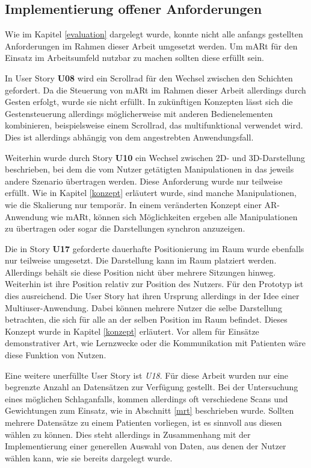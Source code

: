 \subsection{Implementierung offener  Anforderungen}

Wie im Kapitel \ref{evaluation} dargelegt wurde, konnte nicht alle anfangs gestellten Anforderungen im Rahmen dieser Arbeit umgesetzt werden. Um mARt für den Einsatz im Arbeitsumfeld nutzbar zu machen sollten diese erfüllt sein.

In User Story \textbf{U08} wird ein Scrollrad für den Wechsel zwischen den Schichten gefordert. Da die Steuerung von mARt im Rahmen dieser Arbeit allerdings durch Gesten erfolgt, wurde sie nicht erfüllt. In zukünftigen Konzepten lässt sich die Gestensteuerung allerdings möglicherweise mit anderen Bedienelementen kombinieren, beispielsweise einem Scrollrad, das multifunktional verwendet wird. Dies ist allerdings abhängig von dem angestrebten Anwendungsfall.

Weiterhin wurde durch Story \textbf{U10} ein Wechsel zwischen 2D- und 3D-Darstellung beschrieben, bei dem die vom Nutzer getätigten Manipulationen in das jeweils andere Szenario übertragen werden. Diese Anforderung wurde nur teilweise erfüllt. Wie in Kapitel \ref{konzept} erläutert wurde, sind manche Manipulationen, wie die Skalierung nur temporär. In einem veränderten Konzept einer AR-Anwendung wie mARt, können sich Möglichkeiten ergeben alle Manipulationen zu übertragen oder sogar die Darstellungen synchron anzuzeigen.

Die in Story \textbf{U17} geforderte dauerhafte Positionierung im Raum wurde ebenfalls nur teilweise umgesetzt. Die Darstellung kann im Raum platziert werden. Allerdings behält sie diese Position nicht über mehrere Sitzungen hinweg. 
Weiterhin ist ihre Position relativ zur Position des Nutzers. Für den Prototyp ist dies ausreichend. Die User Story hat ihren Ursprung allerdings in der Idee einer Multiuser-Anwendung. Dabei können mehrere Nutzer die selbe Darstellung betrachten, die sich für alle an der selben Position im Raum befindet. Dieses Konzept wurde in Kapitel \ref{konzept} erläutert. Vor allem für Einsätze demonstrativer Art, wie Lernzwecke oder die Kommunikation mit Patienten wäre diese Funktion von Nutzen.

Eine weitere unerfüllte User Story ist \textit{U18}. Für diese Arbeit wurden nur eine begrenzte Anzahl an Datensätzen zur Verfügung gestellt. Bei der Untersuchung eines möglichen Schlaganfalls, kommen allerdings oft verschiedene Scans und Gewichtungen zum Einsatz, wie in Abschnitt \ref{mrt} beschrieben wurde. Sollten mehrere Datensätze zu einem Patienten vorliegen, ist es sinnvoll aus diesen wählen zu können. Dies steht allerdings in Zusammenhang mit der Implementierung einer generellen Auswahl von Daten, aus denen der Nutzer wählen kann, wie sie bereits dargelegt wurde.

